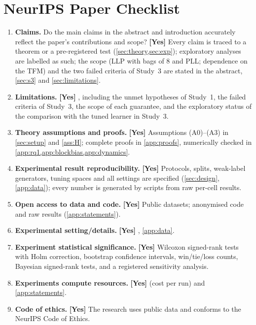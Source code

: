 \section*{NeurIPS Paper Checklist}
\begin{enumerate}
\item \textbf{Claims.} Do the main claims in the abstract and introduction accurately reflect the paper's contributions and
scope? \textbf{[Yes]} Every claim is traced to a theorem or a pre-registered test (\cref{sec:theory,sec:exp}); exploratory
analyses are labelled as such; the scope (LLP with bags of 8 and PLL; dependence on the TFM) and the two failed criteria
of Study~3 are stated in the abstract, \cref{sec:s3} and \cref{sec:limitations}.
\item \textbf{Limitations.} \textbf{[Yes]} , including the unmet hypotheses of Study~1, the failed criteria of
Study~3, the scope of each guarantee, and the exploratory status of the comparison with the tuned learner in Study~3.
\item \textbf{Theory assumptions and proofs.} \textbf{[Yes]} Assumptions (A0)--(A3) in \cref{sec:setup} and \cref{ass:H}; complete proofs in
\cref{app:proofs}, numerically checked in \cref{app:rq1,app:blockbias,app:dynamics}.
\item \textbf{Experimental result reproducibility.} \textbf{[Yes]} Protocols, splits, weak-label generators, tuning spaces
and all settings are specified (\cref{sec:design}, \cref{app:data}); every number is generated by scripts from raw
per-cell results.
\item \textbf{Open access to data and code.} \textbf{[Yes]} Public datasets; anonymised code and raw results
(\cref{app:statements}).
\item \textbf{Experimental setting/details.} \textbf{[Yes]} , \cref{app:data}.
\item \textbf{Experiment statistical significance.} \textbf{[Yes]} Wilcoxon signed-rank tests with Holm correction,
bootstrap confidence intervals, win/tie/loss counts, Bayesian signed-rank tests, and a registered sensitivity analysis.
\item \textbf{Experiments compute resources.} \textbf{[Yes]}  (cost per run) and \cref{app:statements}.
\item \textbf{Code of ethics.} \textbf{[Yes]} The research uses public data and conforms to the NeurIPS Code of Ethics.

\end{enumerate}
